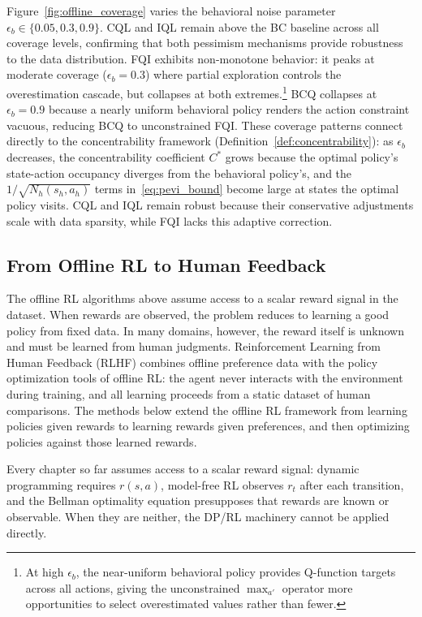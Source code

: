 Figure~\ref{fig:offline_coverage} varies the behavioral noise parameter $\epsilon_b \in \{0.05, 0.3, 0.9\}$. CQL and IQL remain above the BC baseline across all coverage levels, confirming that both pessimism mechanisms provide robustness to the data distribution. FQI exhibits non-monotone behavior: it peaks at moderate coverage ($\epsilon_b = 0.3$) where partial exploration controls the overestimation cascade, but collapses at both extremes.\footnote{At high $\epsilon_b$, the near-uniform behavioral policy provides Q-function targets across all actions, giving the unconstrained $\max_{a'}$ operator more opportunities to select overestimated values rather than fewer.} BCQ collapses at $\epsilon_b = 0.9$ because a nearly uniform behavioral policy renders the action constraint vacuous, reducing BCQ to unconstrained FQI. These coverage patterns connect directly to the concentrability framework (Definition~\ref{def:concentrability}): as $\epsilon_b$ decreases, the concentrability coefficient $C^*$ grows because the optimal policy's state-action occupancy diverges from the behavioral policy's, and the $1/\sqrt{N_h(s_h, a_h)}$ terms in~\eqref{eq:pevi_bound} become large at states the optimal policy visits. CQL and IQL remain robust because their conservative adjustments scale with data sparsity, while FQI lacks this adaptive correction.

\subsection{From Offline RL to Human Feedback}
\label{section:rlhf}

The offline RL algorithms above assume access to a scalar reward signal in the dataset. When rewards are observed, the problem reduces to learning a good policy from fixed data. In many domains, however, the reward itself is unknown and must be learned from human judgments. Reinforcement Learning from Human Feedback (RLHF) combines offline preference data with the policy optimization tools of offline RL: the agent never interacts with the environment during training, and all learning proceeds from a static dataset of human comparisons. The methods below extend the offline RL framework from learning policies given rewards to learning rewards given preferences, and then optimizing policies against those learned rewards.

Every chapter so far assumes access to a scalar reward signal: dynamic programming requires $r(s,a)$, model-free RL observes $r_t$ after each transition, and the Bellman optimality equation presupposes that rewards are known or observable. When they are neither, the DP/RL machinery cannot be applied directly.

